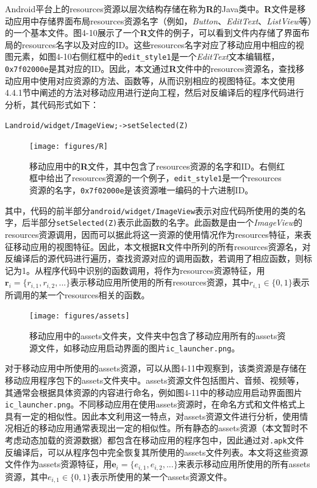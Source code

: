 Android平台上的resources资源以层次结构存储在称为\textbf{R}\cite{r}的Java类中。\textbf{R}文件是移动应用中存储界面布局resources资源名字（例如，\textit{Button}、\textit{EditText}、\textit{ListView}等）的一个基本文件。图4-10展示了一个\textbf{R}文件的例子，可以看到文件内存储了界面布局的resources名字以及对应的ID。这些resources名字对应了移动应用中相应的视图元素，如图4-10右侧红框中的\texttt{edit\_style1}是一个\textit{EditText}文本编辑框，\texttt{0x7f02000e}是其对应的ID。因此，本文通过\textbf{R}文件中的resources资源名，查找移动应用中使用对应资源的方法、函数等，从而识别相应的视图特征。本文使用4.4.1节中阐述的方法对移动应用进行逆向工程，然后对反编译后的程序代码进行分析，其代码形式如下：
\begin{center}
\texttt{Landroid/widget/ImageView;->setSelected(Z)}
\end{center}
\begin{figure}
	\centering
	\texttt{[image: figures/R]}
	\caption{移动应用中的\textbf{R}文件，其中包含了resources资源的名字和ID。右侧红框中给出了resources资源的一个例子，\texttt{edit\_style1}是一个resources资源的名字，\texttt{0x7f02000e}是该资源唯一编码的十六进制ID。}
\end{figure}
其中，代码的前半部分\texttt{android/widget/ImageView}表示对应代码所使用的类的名字，后半部分\texttt{setSelected(Z)}表示此函数的名字。此函数是由一个\textit{ImageView}的resources资源调用，因而可以据此将这一资源的使用情况作为resources特征，来表征移动应用的视图特征。因此，本文根据\textbf{R}文件中所列的所有resources资源名，对反编译后的源代码进行遍历，查找资源对应的调用函数，若调用了相应函数，则标记为1。从程序代码中识别的函数调用，将作为resources资源特征，用$\textbf{r}_i = \{r_{i,1}, r_{i,2}, ...\}$表示移动应用所使用的所有resources资源，其中$r_{i,1} \in \{0, 1\}$表示所调用的某一个resources相关的函数。

\begin{figure}
	\centering
	\texttt{[image: figures/assets]}
	\caption{移动应用中的assets文件夹，文件夹中包含了移动应用所有的assets资源文件，如移动应用启动界面的图片\texttt{ic\_launcher.png}。}
\end{figure}

对于移动应用中所使用的assets资源，可以从图4-11中观察到，该类资源是存储在移动应用程序包下的assets文件夹中。assets资源文件包括图片、音频、视频等，其通常会根据具体资源的内容进行命名，例如图4-11中的移动应用启动界面图片\texttt{ic\_launcher.png}。不同移动应用在使用assets资源时，在命名方式和文件格式上具有一定的相似性。因此本文利用这一特点，对assets资源文件进行分析，使用情况相近的移动应用通常表现出一定的相似性。所有静态的assets资源（本文暂时不考虑动态加载的资源数据）都包含在移动应用的程序包中，因此通过对\texttt{.apk}文件反编译后，可以从程序包中完全恢复其所使用的assets文件列表。本文将这些资源文件作为assets资源特征，用$\textbf{e}_i = \{e_{i,1}, e_{i,2}, ...\}$来表示移动应用所使用的所有assets资源，其中$e_{i,1} \in \{0, 1\}$表示所使用的某一个assets资源文件。

